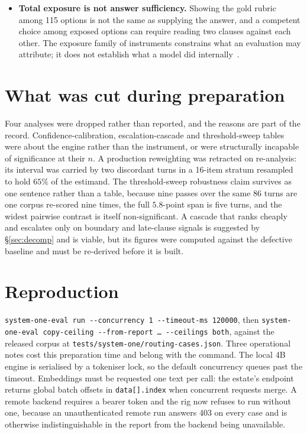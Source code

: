 \documentclass[10pt,twocolumn]{article}
\begin{document}
\begin{itemize}[topsep=2pt,itemsep=3pt,leftmargin=1.4em]
Table~\ref{tab:routing} is not a controlled architecture comparison. Judge idiosyncrasy and
self-preference apply to the cloud column as they do to any model-as-judge
result~\cite{zheng2023judging,panickssery2024selfpreference}.
\item \textbf{Total exposure is not answer sufficiency.} Showing the gold rubric among 115
options is not the same as supplying the answer, and a competent choice among exposed options
can require reading two clauses against each other. The exposure family of instruments
constrains what an evaluation may attribute; it does not establish what a model did
internally~\cite{ragchecker2024,sufficientcontext2025}.
\end{itemize}

\section{What was cut during preparation}\label{sec:cut}
Four analyses were dropped rather than reported, and the reasons are part of the record.
Confidence-calibration, escalation-cascade and threshold-sweep tables were about the engine
rather than the instrument, or were structurally incapable of significance at their $n$. A
production reweighting was retracted on re-analysis: its interval was carried by two
discordant turns in a 16-item stratum resampled to hold $65\%$ of the estimand. The
threshold-sweep robustness claim survives as one sentence rather than a table, because nine
passes over the same 86 turns are one corpus re-scored nine times, the full $5.8$-point span
is five turns, and the widest pairwise contrast is itself non-significant. A cascade that
ranks cheaply and escalates only on boundary and late-clause signals is suggested by
\S\ref{sec:decomp} and is viable, but its figures were computed against the defective
baseline and must be re-derived before it is built.

\section{Reproduction}\label{sec:repro}
\texttt{system-one-eval run -{}-concurrency 1 -{}-timeout-ms 120000}, then
\texttt{system-one-eval copy-ceiling -{}-from-report \ldots{} -{}-ceilings both}, against the
released corpus at \texttt{tests/system-one/routing-cases.json}. Three operational notes cost
this preparation time and belong with the command. The local 4B engine is serialised by a
tokeniser lock, so the default concurrency queues past the timeout. Embeddings must be
requested one text per call: the estate's endpoint returns global batch offsets in
\texttt{data[].index} when concurrent requests merge. A remote backend requires a bearer
token and the rig now refuses to run without one, because an unauthenticated remote run
answers 403 on every case and is otherwise indistinguishable in the report from the backend
being unavailable.
\end{document}
